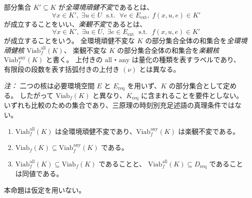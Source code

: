 \begin{definition}
\label{def:kernel_all_any}
部分集合 $K'\subseteq K$ が\emph{全環境頑健不変}であるとは、
\[
  \forall x\in K',\;\exists u\in U\;\text{ s.t. }\;\forall e\in E_{\mathrm{ext}},\;f(x,u,e)\in K'
\]
が成立することをいい、\emph{楽観不変}であるとは、
\[
  \forall x\in K',\;\exists u\in U,\;\exists e\in E_{\mathrm{ext}}\;\text{ s.t. }\;f(x,u,e)\in K'
\]
が成立することをいう。
全環境頑健不変な $K$ の部分集合全体の和集合を\emph{全環境頑健核} $\mathrm{Viab}_f^{\mathrm{all}}(K)$、
楽観不変な $K$ の部分集合全体の和集合を\emph{楽観核} $\mathrm{Viab}_f^{\mathrm{any}}(K)$ と書く。
上付きの $\mathrm{all}$・$\mathrm{any}$ は量化の種類を表すラベルであり、
有限段の段数を表す括弧付きの上付き $(\nu)$ とは異なる。

\textit{注：}
二つの核は必要環境空間 $E$ と $E_{\mathrm{req}}$ を用いず、$K$ の部分集合として定める。
したがって $\mathrm{Viab}_f(K)$ と異なり、$K_{\mathrm{req}}$ に含まれることを要件としない。
いずれも比較のための集合であり、三原理の時刻別充足述語の真理条件ではない。
\end{definition}

\begin{proposition}
\label{prop:kernel_standard_comparison}
\begin{enumerate}[label=(\roman*)]
  \item $\mathrm{Viab}_f^{\mathrm{all}}(K)$ は全環境頑健不変であり、$\mathrm{Viab}_f^{\mathrm{any}}(K)$ は楽観不変である。
  \item $\mathrm{Viab}_f(K)\subseteq\mathrm{Viab}_f^{\mathrm{any}}(K)$ である。
  \item $\mathrm{Viab}_f^{\mathrm{all}}(K)\subseteq\mathrm{Viab}_f(K)$ であることと、
  $\mathrm{Viab}_f^{\mathrm{all}}(K)\subseteq D_{\mathrm{req}}$ であることは同値である。
\end{enumerate}
本命題は仮定を用いない。
\end{proposition}


